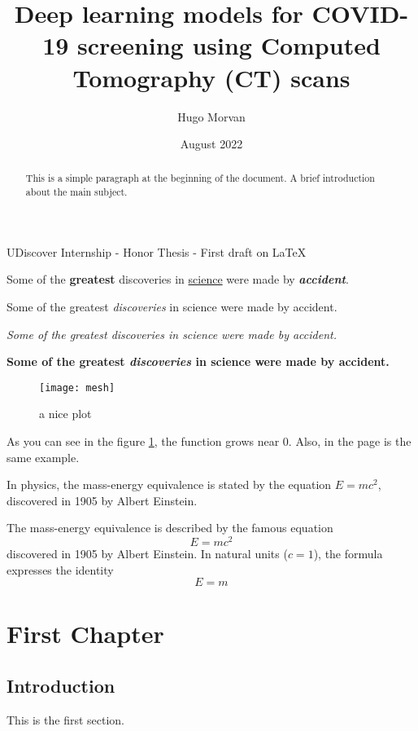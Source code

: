 \documentclass[12pt, letterpaper]{article}
\title{Deep learning models for COVID-19 screening using Computed Tomography (CT)
scans}
\author{Hugo Morvan}
\date{August 2022}
\begin{document}
\maketitle

UDiscover Internship - Honor Thesis - First draft on \LaTeX{}

Some of the \textbf{greatest}
discoveries in \underline{science} 
were made by \textbf{\textit{accident}}.

Some of the greatest \emph{discoveries} 
in science 
were made by accident.

\textit{Some of the greatest \emph{discoveries} 
in science 
were made by accident.}

\textbf{Some of the greatest \emph{discoveries} 
in science 
were made by accident.}


\begin{figure}[h]
    \centering
    \texttt{[image: mesh]}
    \caption{a nice plot}
    \label{fig:mesh1}
\end{figure}

As you can see in the figure \ref{fig:mesh1}, the 
function grows near 0. Also, in the page \pageref{fig:mesh1} 
is the same example.

In physics, the mass-energy equivalence is stated 
by the equation $E=mc^2$, discovered in 1905 by Albert Einstein.

The mass-energy equivalence is described by the famous equation
\[ E=mc^2 \]
discovered in 1905 by Albert Einstein. 
In natural units ($c = 1$), the formula expresses the identity
\begin{equation}
E=m
\end{equation}


\begin{abstract}
This is a simple paragraph at the beginning of the 
document. A brief introduction about the main subject.
\end{abstract}


\chapter{First Chapter}

\section{Introduction}

This is the first section.
\end{document}
